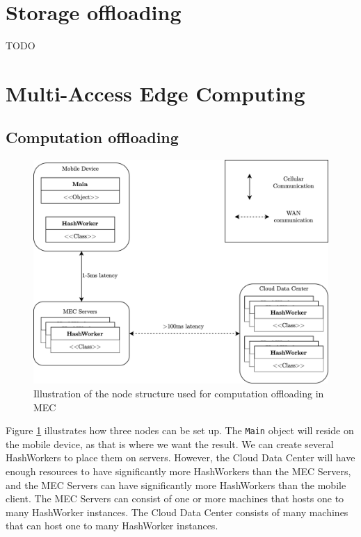 \section{Storage offloading}
TODO













\section{Multi-Access Edge Computing}
% 
\subsection{Computation offloading}
\begin{figure}[t]
    \centering
    \includegraphics[scale=1]{chapters/implementation/figures/MEC_implementation.png}
    \caption{Illustration of the node structure used for computation offloading in MEC}
    \label{fig:MEC_implementation}
\end{figure}
Figure \ref{fig:MEC_implementation} illustrates how three nodes can be set up. The \verb|Main| object will reside on the mobile device, as that is where we want the result. We can create several HashWorkers to place them on servers. However, the Cloud Data Center will have enough resources to have significantly more HashWorkers than the MEC Servers, and the MEC Servers can have significantly more HashWorkers than the mobile client. The MEC Servers can consist of one or more machines that hosts one to many HashWorker instances. The Cloud Data Center consists of many machines that can host one to many HashWorker instances.


